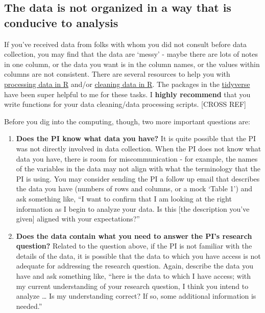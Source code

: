 \documentclass[
]{book}
\begin{document}
\hypertarget{the-data-is-not-organized-in-a-way-that-is-conducive-to-analysis}{%
\subsection{The data is not organized in a way that is conducive to analysis}\label{the-data-is-not-organized-in-a-way-that-is-conducive-to-analysis}}

If you've received data from folks with whom you did not consult before data collection, you may find that the data are `messy' - maybe there are lots of notes in one column, or the data you want is in the column names, or the values within columns are not consistent. There are several resources to help you with \href{https://www.geeksforgeeks.org/processing-of-raw-data-to-tidy-data-in-r/}{processing data in R} and/or \href{https://www.geeksforgeeks.org/data-cleaning-in-r/}{cleaning data in R}. The packages in the \href{https://www.tidyverse.org/packages/}{tidyverse} have been super helpful to me for these tasks. I \textbf{highly recommend} that you write functions for your data cleaning/data processing scripts. {[}CROSS REF{]}

Before you dig into the computing, though, two more important questions are:

\begin{enumerate}
\def\labelenumi{\arabic{enumi}.}
\item
  \textbf{Does the PI know what data you have?} It is quite possible that the PI was not directly involved in data collection. When the PI does not know what data you have, there is room for miscommunication - for example, the names of the variables in the data may not align with what the terminology that the PI is using. You may consider sending the PI a follow up email that describes the data you have (numbers of rows and columns, or a mock `Table 1') and ask something like, ``I want to confirm that I am looking at the right information as I begin to analyze your data. Is this {[}the description you've given{]} aligned with your expectations?''
\item
  \textbf{Does the data contain what you need to answer the PI's research question?} Related to the question above, if the PI is not familiar with the details of the data, it is possible that the data to which you have access is not adequate for addressing the research question. Again, describe the data you have and ask something like, ``here is the data to which I have access; with my current understanding of your research question, I think you intend to analyze \ldots{} Is my understanding correct? If so, some additional information is needed.''
\end{enumerate}
\end{document}

